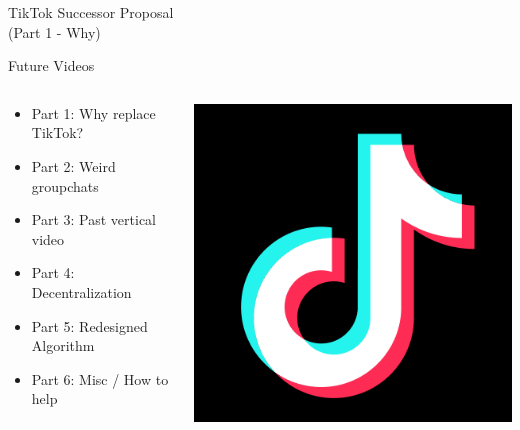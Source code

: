 \documentclass[aspectratio=169]{beamer}
\begin{document}
\begin{frame}
    \centering
    \Huge TikTok Successor Proposal \\
    \Huge (Part 1 - Why)
\end{frame}

\begin{frame}{Future Videos}
\begin{columns}[T]
    \begin{column}[T]{0.5\textwidth}
        \begin{itemize}
            \item Part 1: Why replace TikTok?
            \item Part 2: Weird groupchats 
            \item Part 3: Past vertical video
            \item Part 4: Decentralization
            \item Part 5: Redesigned Algorithm
            \item Part 6: Misc / How to help
        \end{itemize}
    \end{column}
    \begin{column}{0.5\textwidth}
        \includegraphics[height=0.8\textheight]{imgs/app_icons/tiktok-icon2.png}
    \end{column}
\end{columns}
\end{frame}
\end{document}
